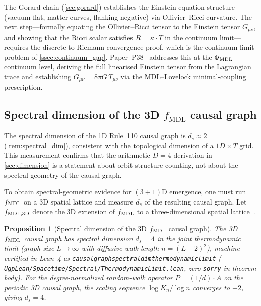 \documentclass[11pt]{article}
\newtheorem{proposition}[theorem]{Proposition}
\theoremstyle{remark}
\newcommand{\lean}[1]{%
  \penalty-100
  \begingroup\def\_{\textunderscore\allowbreak}\texttt{#1}\endgroup}
\begin{document}
The Gorard chain (\cref{sec:gorard}) establishes the Einstein-equation
structure (vacuum flat, matter curves, flanking negative) via Ollivier--Ricci
curvature.
The next step---formally equating the Ollivier--Ricci tensor to the
Einstein tensor $G_{\mu\nu}$, and showing that the Ricci scalar satisfies
$R = \kappa \cdot T$ in the continuum limit---requires the discrete-to-Riemann
convergence proof, which is the continuum-limit problem of
\cref{ssec:continuum_gap}.
Paper~P38~\cite{SpivackPhiMDLGravity} addresses this at the $\Phi_{\rm MDL}$
continuum level, deriving the full linearised Einstein tensor from the
Lagrangian trace and establishing $G_{\mu\nu} = 8\pi G\,T_{\mu\nu}$ via
the MDL--Lovelock minimal-coupling prescription.

\subsection{Spectral dimension of the 3D \texorpdfstring{$f_{\mathrm{MDL}}$}{f\_MDL} causal graph}
\label{ssec:spectral_dim_resolved}

The spectral dimension of the 1D Rule~110 causal graph is $d_s \approx 2$
(\cref{rem:spectral_dim}), consistent with the topological dimension of a
$1D \times T$ grid.
This measurement confirms that the arithmetic $D = 4$ derivation in
\cref{sec:dimension} is a statement about orbit-structure counting, not
about the spectral geometry of the causal graph.

To obtain spectral-geometric evidence for $(3{+}1)$D emergence, one must
run $f_{\rm MDL}$ on a 3D spatial lattice and measure $d_s$ of the
resulting causal graph.
Let $f_{\rm MDL,3D}$ denote the 3D extension of $f_{\rm MDL}$ to a
three-dimensional spatial lattice~\cite{SpivackCompUniversality}.

\begin{proposition}[Spectral dimension of the 3D $f_{\rm MDL}$ causal graph]
\label{prop:spectral_dim_3d}
The 3D $f_{\rm MDL}$ causal graph has spectral dimension $d_s = 4$ in the
joint thermodynamic limit (graph size $L \to \infty$ with diffusive walk
length $n = (L+2)^2$), machine-certified in Lean~4 as
\lean{causal\_graph\_spectral\_dim\_thermodynamic\_limit}
(\lean{UgpLean/Spacetime/Spectral/ThermodynamicLimit.lean}, zero \texttt{sorry} in theorem body).
For the degree-normalized random-walk operator $P = (1/d)\cdot A$ on the
periodic 3D causal graph, the scaling sequence $\log K_n / \log n$ converges
to $-2$, giving $d_s = 4$.
\end{proposition}
\end{document}
